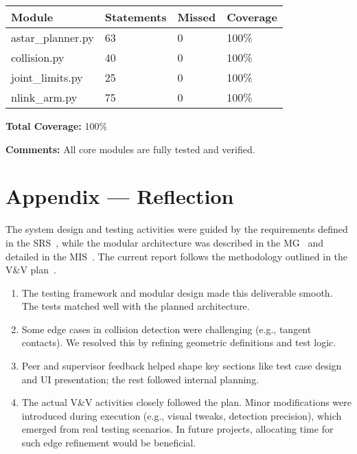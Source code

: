 \documentclass[12pt, titlepage]{article}
\begin{document}
\begin{tabularx}{\textwidth}{l l l l}
\toprule
\textbf{Module} & \textbf{Statements} & \textbf{Missed} & \textbf{Coverage} \\
\midrule
astar\_planner.py & 63 & 0 & 100\% \\
collision.py & 40 & 0 & 100\% \\
joint\_limits.py & 25 & 0 & 100\% \\
nlink\_arm.py & 75 & 0 & 100\% \\
\bottomrule
\end{tabularx}

\textbf{Total Coverage:} 100\%

\textbf{Comments:} All core modules are fully tested and verified.




\newpage{}
\section*{Appendix --- Reflection}

The system design and testing activities were guided by the requirements defined in the SRS~\citep{SRS2025}, 
while the modular architecture was described in the MG~\citep{MG2025} and detailed in the MIS~\citep{MIS2025}. 
The current report follows the methodology outlined in the V\&V plan~\citep{VnV2025}.


\begin{enumerate}
  \item The testing framework and modular design made this deliverable smooth. The tests matched well with the planned architecture.
  \item Some edge cases in collision detection were challenging (e.g., tangent contacts). We resolved this by refining geometric definitions and test logic.
  \item Peer and supervisor feedback helped shape key sections like test case design and UI presentation; the rest followed internal planning.
  \item The actual V\&V activities closely followed the plan. Minor modifications were introduced during execution (e.g., visual tweaks, detection precision), which emerged from real testing scenarios. In future projects, allocating time for such edge refinement would be beneficial.
\end{enumerate}
\end{document}
